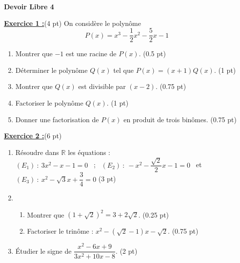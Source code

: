 \documentclass[12pt,a4paper]{article}
\begin{document}
\pagestyle{fancy}
\fancyhf{} %
\fancyfoot[C]{\thepage} %


\begin{center}
    \textbf{\Large  Devoir Libre 4}
\end{center}

\underline{\large\textbf{Exercice 1 :}}(4 pt)
On considère le polynôme \[P(x) = x^3 - \dfrac{1}{2}x^2 -\dfrac{5}{2} x - 1\]

\begin{enumerate}
    \item Montrer que \(-1\) est une racine de \(P(x)\). (0.5 pt)
    \item Déterminer le polynôme \(Q(x)\) tel que \(P(x) = (x + 1)Q(x)\). (1 pt)
    \item Montrer que \(Q(x)\) est divisible par \((x - 2)\). (0.75 pt)
    \item Factoriser le polynôme \(Q(x)\). (1 pt)
    \item Donner une factorisation de \(P(x)\) en produit de trois binômes. (0.75 pt)
\end{enumerate}
\underline{\large\textbf{Exercice 2 :}}(6 pt)
\begin{enumerate}
	\item Résoudre dans $\mathbb{R}$ les équations : \\ $(E_1)\ : \ 3x^2 - x - 1 = 0$ \ ; \ $(E_2)\ : \ -x^2 - \dfrac{\sqrt{2}}{2}x - 1 = 0$ \ et \ $(E_3)\ : \ x^2 - \sqrt{3}x + \dfrac{3}{4} = 0$ (3 pt)
	\item 
		\begin{enumerate}
			\item Montrer que $(1+\sqrt{2})^2 = 3 + 2\sqrt{2}$. (0.25 pt)
			\item Factoriser le trinôme : $x^2 - (\sqrt{2} - 1)x - \sqrt{2}$. (0.75 pt)
		\end{enumerate}
	\item Étudier le signe de $\dfrac{x^2-6x +9}{3x^2 + 10x - 8}$. (2 pt)
\end{enumerate}
\end{document}
